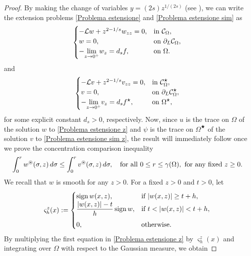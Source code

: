 \documentclass[a4paper,10pt,reqno]{amsart}
\numberwithin{equation}{section}
\begin{document}
\begin{proof}
By making the change of variables $y=(2s)z^{1/(2s)}$ (see \cite{Caffarelli-Silvestre}), we can write the extension problems
\eqref{Problema estensione} and \eqref{Problema estensione sim} as
\begin{equation}\label{Problema estensione z}
\begin{cases}
-\mathcal{L}w+z^{2-1/s}w_{zz}=0,&\hbox{in}~\mathcal{C}_{\Omega},\\
w=0,&\hbox{on}~\partial_{L}\mathcal{C}_{\Omega},\\
-\underset{z\rightarrow0^{+}}{\lim}w_z=d_sf,&\hbox{on}~\Omega.
\end{cases}
\end{equation}
and
\begin{equation}\label{Problema estensione sim z}
\begin{cases}
-\mathcal{L}v+z^{2-1/s}v_{zz}=0,&\hbox{in}~\mathcal{C}_{\Omega}^{\displaystyle\star},\\
v=0,&\hbox{on}~\partial_{L}\mathcal{C}_{\Omega}^{\displaystyle\star},\\
-\underset{z\rightarrow0^{+}}{\lim}v_z=d_sf^{\displaystyle\star},&\hbox{on}~\Omega^{\displaystyle\star},
\end{cases}
\end{equation}
for some explicit constant $d_s>0$, respectively.
Now, since $u$ is the trace on $\Omega$ of the
solution $w$ to \eqref{Problema estensione z} and $\psi$ is the trace on $\Omega^{\bigstar}$ of the solution $v$ to
\eqref{Problema estensione sim z}, the result will immediately
follow once we prove the concentration comparison inequality
\begin{equation}
\int_{0}^{r}w^{\circledast}(\sigma,z)\,d\sigma\leq\int_{0}^{r}v^{\circledast}(\sigma,z)\,d\sigma,
\quad\hbox{for all}~0\leq r\leq\gamma(\Omega),~\hbox{for any fixed}~z\geq0.
\label{concentrazione}%
\end{equation}
We recall that $w$ is smooth for any $z>0$. For a fixed
$z>0$ and $t>0$, let
\[\varsigma_{h}^{z}(x):=
\begin{cases}
\mathrm{sign}\,w(x,z),&\hbox{if}~|w(x,z)|\geq t+h,\\ \medskip
\dfrac{|w(x,z)|-t}{h}\,\mathrm{sign}\,w,&\hbox{if}~t<|w(x,z)|<t+h,\\
0,&\hbox{otherwise}.
\end{cases}\]
By multiplying the first equation in \eqref{Problema estensione z} by $\varsigma_{h}^{z}(x)$
and integrating over $\Omega$ with respect to the Gaussian measure, we obtain

\end{proof}
\end{document}
